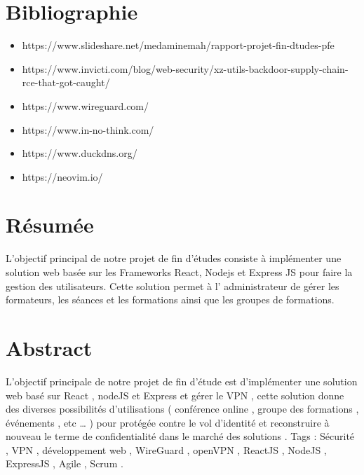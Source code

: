 \section{Bibliographie}
 
\begin{itemize}
  \item https://www.slideshare.net/medaminemah/rapport-projet-fin-dtudes-pfe 
  \item https://www.invicti.com/blog/web-security/xz-utils-backdoor-supply-chain-rce-that-got-caught/  
  \item https://www.wireguard.com/  
  \item https://www.in-no-think.com/ 
  \item https://www.duckdns.org/ 
  \item https://neovim.io/  
\end{itemize}


\section{Résumée}

L’objectif principal de notre projet de fin d’études consiste à implémenter une solution web basée sur les Frameworks React, Nodejs et  Express JS pour faire la gestion des utilisateurs.
Cette solution permet à l' administrateur de gérer les formateurs, les séances et les 
formations ainsi que les groupes de formations.  


\section{Abstract}
 L'objectif principale de notre projet de fin d'étude est d'implémenter une solution web basé sur React , nodeJS et Express et gérer le VPN , cette solution donne des diverses possibilités d'utilisations ( conférence online , groupe des formations , événements  , etc … )  pour protégée contre le vol d'identité et reconstruire à nouveau le terme de confidentialité dans le marché des solutions .
Tags : Sécurité , VPN , développement web , WireGuard , openVPN ,  ReactJS , NodeJS , ExpressJS ,   Agile , Scrum . 


